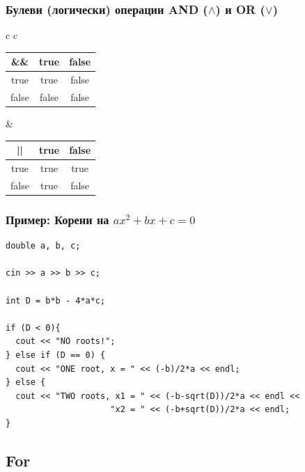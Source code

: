 \documentclass{beamer}
\begin{document}
\begin{frame}[fragile]
\frametitle{Булеви (логически) операции AND ($\wedge$) и OR ($\vee$)}

\begin{center}


\begin{tabular}{ c c }

\begin{tabular}{ c | c  c }
  \hline
  \&\&  & true  & false \\ \hline
  true  & true  & false \\
  false & false & false \\

\end{tabular} &

\begin{tabular}{ c | c  c }
  \hline
  ||  & true  & false \\ \hline
  true  & true  & true \\
  false & true & false \\

\end{tabular}

\end{tabular}
\end{center}



\end{frame}


\begin{frame}[fragile]
\frametitle{Пример: Корени на $ax^2+bx+c=0$}

\begin{lstlisting}
double a, b, c;

cin >> a >> b >> c;

int D = b*b - 4*a*c;

if (D < 0){
  cout << "NO roots!";
} else if (D == 0) {
  cout << "ONE root, x = " << (-b)/2*a << endl;
} else {
  cout << "TWO roots, x1 = " << (-b-sqrt(D))/2*a << endl <<
                     "x2 = " << (-b+sqrt(D))/2*a << endl;
}

\end{lstlisting}


\end{frame}


\subsection{For}
\end{document}
